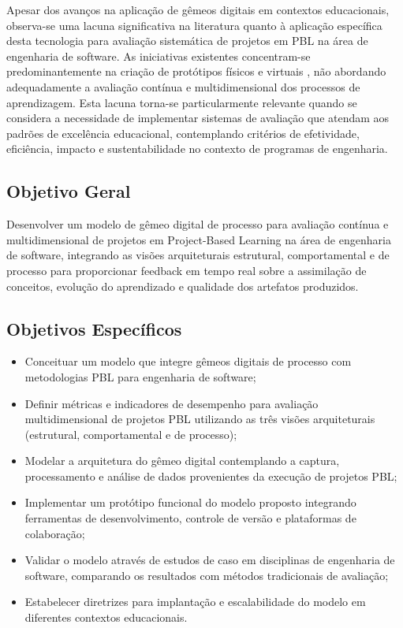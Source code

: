 \documentclass[12pt,a4paper]{article}
\begin{document}
Apesar dos avanços na aplicação de gêmeos digitais em contextos educacionais, observa-se uma lacuna significativa na literatura quanto à aplicação específica desta tecnologia para avaliação sistemática de projetos em PBL na área de engenharia de software. As iniciativas existentes concentram-se predominantemente na criação de protótipos físicos e virtuais \cite{bachmann2023}, não abordando adequadamente a avaliação contínua e multidimensional dos processos de aprendizagem. Esta lacuna torna-se particularmente relevante quando se considera a necessidade de implementar sistemas de avaliação que atendam aos padrões de excelência educacional, contemplando critérios de efetividade, eficiência, impacto e sustentabilidade no contexto de programas de engenharia.

\subsection{Objetivo Geral}

Desenvolver um modelo de gêmeo digital de processo para avaliação contínua e multidimensional de projetos em Project-Based Learning na área de engenharia de software, integrando as visões arquiteturais estrutural, comportamental e de processo para proporcionar feedback em tempo real sobre a assimilação de conceitos, evolução do aprendizado e qualidade dos artefatos produzidos.

\subsection{Objetivos Específicos}

\begin{itemize}
\item Conceituar um modelo que integre gêmeos digitais de processo com metodologias PBL para engenharia de software;
\item Definir métricas e indicadores de desempenho para avaliação multidimensional de projetos PBL utilizando as três visões arquiteturais (estrutural, comportamental e de processo);
\item Modelar a arquitetura do gêmeo digital contemplando a captura, processamento e análise de dados provenientes da execução de projetos PBL;
\item Implementar um protótipo funcional do modelo proposto integrando ferramentas de desenvolvimento, controle de versão e plataformas de colaboração;
\item Validar o modelo através de estudos de caso em disciplinas de engenharia de software, comparando os resultados com métodos tradicionais de avaliação;
\item Estabelecer diretrizes para implantação e escalabilidade do modelo em diferentes contextos educacionais.
\end{itemize}
\end{document}
